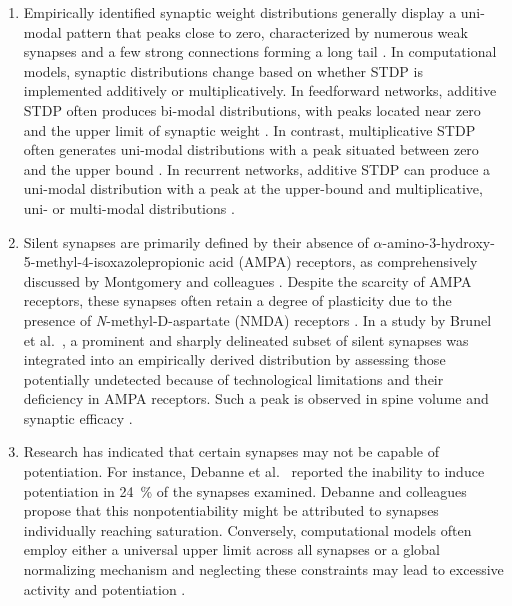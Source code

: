 \documentclass[utf8]{FrontiersinHarvard} %
\begin{document}
\begin{enumerate}
    \item Empirically identified synaptic weight distributions generally display a uni-modal pattern that peaks close to zero, characterized by numerous weak synapses and a few strong connections forming a long tail \citep{Buzsaki.2004n8e,Yasumatsu.2008g4n,KASAI.20239m}. In computational models, synaptic distributions change based on whether STDP is implemented additively or multiplicatively. In feedforward networks, additive STDP often produces bi-modal distributions, with peaks located near zero and the upper limit of synaptic weight \citep{Rossum.2000jye,Barbour.2007,Morrison.2008}. In contrast, multiplicative STDP often generates uni-modal distributions with a peak situated between zero and the upper bound \citep{Rossum.2000jye,Barbour.2007,Morrison.2008}. In recurrent networks, additive STDP can produce a uni-modal distribution with a peak at the upper-bound and multiplicative, uni- or multi-modal distributions \citep{Morrison.2007}.

    \item Silent synapses are primarily defined by their absence of $\alpha$-amino-3-hydroxy-5-methyl-4-isoxazolepropionic acid (AMPA) receptors, as comprehensively discussed by Montgomery and colleagues \citeyearpar{Montgomery.2004}. Despite the scarcity of AMPA receptors, these synapses often retain a degree of plasticity due to the presence of \textit{N}-methyl-D-aspartate (NMDA) receptors \citep{Kim.2025}. In a study by Brunel et al.~\citeyearpar{Brunel.2004}, a prominent and sharply delineated subset of silent synapses was integrated into an empirically derived distribution by assessing those potentially undetected because of technological limitations and their deficiency in AMPA receptors. Such a peak is observed in spine volume \citep{Yasumatsu.2008g4n} and synaptic efficacy \citep{Barbour.2007}.

    \item Research has indicated that certain synapses may not be capable of potentiation. For instance, Debanne et al.~\citeyearpar{Debanne.1999} reported the inability to induce potentiation in \SI{24}{\percent} of the synapses examined. Debanne and colleagues propose that this nonpotentiability might be attributed to synapses individually reaching saturation. Conversely, computational models often employ either a universal upper limit across all synapses or a global normalizing mechanism and neglecting these constraints may lead to excessive activity and potentiation \citep{Rossum.2000jye}.


\end{enumerate}
\end{document}
